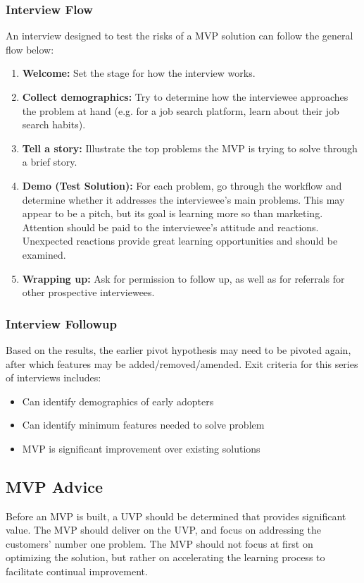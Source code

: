 \documentclass[12pt,titlepage]{article}
\begin{document}
      \subsubsection{Interview Flow}
        An interview designed to test the risks of a MVP solution can follow the general flow below:
        \begin{enumerate}
          \item \textbf{Welcome:} Set the stage for how the interview works.
          \item \textbf{Collect demographics:} Try to determine how the interviewee approaches the problem at hand (e.g. for a job search platform,
          learn about their job search habits).
          \item \textbf{Tell a story:} Illustrate the top problems the MVP is trying to solve through a brief story.
          \item \textbf{Demo (Test Solution):} For each problem, go through the workflow and determine whether it addresses the interviewee's main
          problems. This may appear to be a pitch, but its goal is learning more so than marketing. Attention should be paid to the interviewee's
          attitude and reactions. Unexpected reactions provide great learning opportunities and should be examined.
          \item \textbf{Wrapping up:} Ask for permission to follow up, as well as for referrals for other prospective interviewees.
        \end{enumerate}

      \subsubsection{Interview Followup}
        Based on the results, the earlier pivot hypothesis may need to be pivoted again, after which features may be added/removed/amended.
        Exit criteria for this series of interviews includes:
        \begin{itemize}
          \item Can identify demographics of early adopters
          \item Can identify minimum features needed to solve problem
          \item MVP is significant improvement over existing solutions
        \end{itemize}

    \subsection{MVP Advice}
      Before an MVP is built, a UVP should be determined that provides significant value. The MVP should deliver on the UVP, and focus on
      addressing the customers' number one problem. The MVP should not focus at first on optimizing the solution, but rather on accelerating the
      learning process to facilitate continual improvement.
\end{document}
